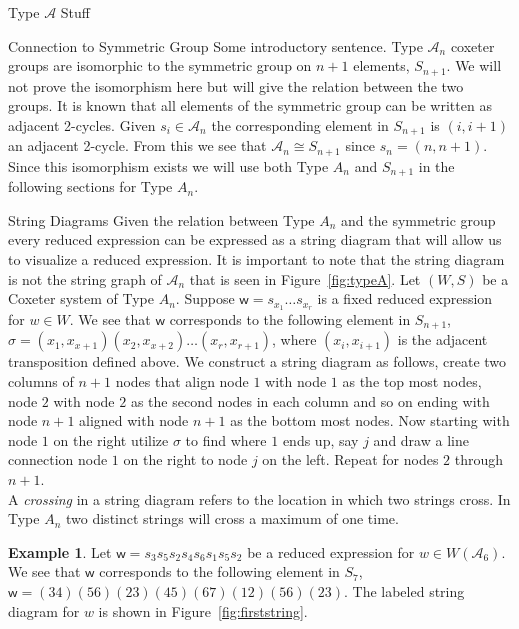 \documentclass[11pt]{amsart}
\theoremstyle{definition}
\newtheorem{example}[theorem]{Example}
\numberwithin{equation}{section}
\newcommand{\A}{\mathcal{A}}
\renewcommand{\(}{\left(}
\renewcommand{\)}{\right)}
\newcommand{\w}{\mathsf{w}}
\begin{document}
\begin{section}{Type $\A$ Stuff}

\begin{subsection}{Connection to Symmetric Group}
Some introductory sentence. Type $\A_n$ coxeter groups are isomorphic to the symmetric group on $n+1$ elements, $S_{n+1}$. We will not prove the isomorphism here but will give the relation between the two groups. It is known that all elements of the symmetric group can be written as adjacent 2-cycles. Given $s_i \in \A_n$ the corresponding element in $S_{n+1}$ is $(i, i+1)$ an adjacent 2-cycle. From this we see that $\A_n \cong S_{n+1}$ since $s_n=(n, n+1)$. Since this isomorphism exists we will use both Type $A_n$ and $S_{n+1}$ in the following sections for Type $A_n$. 
\end{subsection}

\begin{subsection}{String Diagrams}
Given the relation between Type $A_n$ and the symmetric group every reduced expression can be expressed as a string diagram that will allow us to visualize a reduced expression. It is important to note that the string diagram is not the string graph of $\A_n$ that is seen in Figure~\ref{fig:typeA}. Let $(W,S)$ be a Coxeter system of Type $A_n$. Suppose $\w=s_{x_1} \ldots s_{x_r}$ is a fixed reduced expression for $w \in W$. We see that $\w$ corresponds to the following element in $S_{n+1}$, $\sigma=(x_1,x_{x+1})(x_2,x_{x+2}) \ldots (x_r,x_{r+1})$, where $(x_i,x_{i+1})$ is the adjacent transposition defined above. We construct a string diagram as follows, create two columns of $n+1$ nodes that align node $1$ with node $1$ as the top most nodes, node $2$ with node $2$ as the second nodes in each column and so on ending with node $n+1$ aligned with node $n+1$ as the bottom most nodes. Now starting with node $1$ on the right utilize $\sigma$ to find where $1$ ends up, say $j$ and draw a line connection node $1$ on the right to node $j$ on the left. Repeat for nodes $2$ through $n+1$. \\
A \emph{crossing} in a string diagram refers to the location in which two strings cross. In Type $A_n$ two distinct strings will cross a maximum of one time. 
\begin{example}\label{ex:first string}
Let $\w=s_3 s_5 s_2 s_4 s_6 s_1 s_5 s_2$ be a reduced expression for $w \in W(\A_6)$. We see that $\w$ corresponds to the following element in $S_7$,~$\w=(34)(56)(23)(45)(67)(12)(56)(23)$. The labeled string diagram for $w$ is shown in Figure~\ref{fig:firststring}.


\end{example}
\end{subsection}
\end{section}
\end{document}
